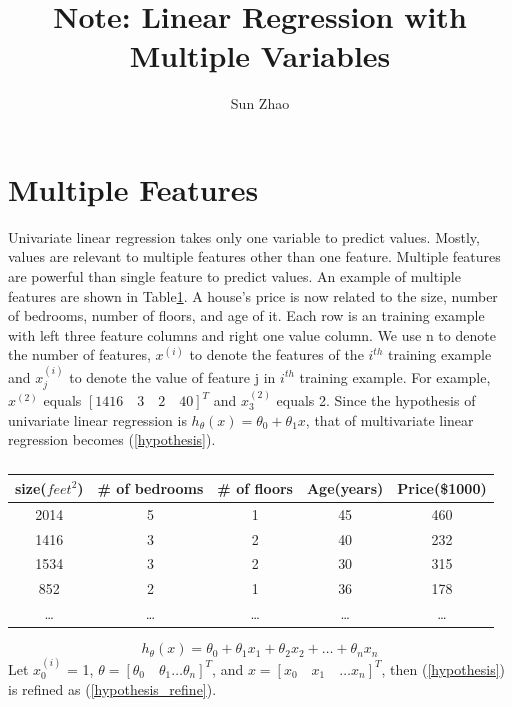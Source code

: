 \documentclass{article}
\title{Note: Linear Regression with Multiple Variables}
\author{Sun Zhao}
\begin{document}
\maketitle
\newpage

\section{Multiple Features}
Univariate linear regression takes only one variable to predict values. Mostly, values are relevant to multiple features other than one feature. Multiple features are powerful than single
 feature to predict values. An example of multiple features are shown in Table\ref{multivate_feature_example}. A house's price is now related to the size, number of bedrooms, number of floors, and age of it. Each row is an training example with left three feature columns and right one value column. We use n to denote the number of features, $x^{(i)}$ to denote the features of the $i^{th}$ training example and $x^{(i)}_{j}$ to denote the value of feature j in $i^{th}$ training example. For example, $x^{(2)}$ equals $[1416 \quad 3 \quad 2 \quad 40]^{T}$ and $x^{(2)}_{3}$ equals 2. Since the hypothesis of univariate linear regression is $h_{\theta}(x) = \theta_{0} + \theta_{1}x$, that of multivariate linear regression becomes (\ref{hypothesis}).

\begin{table}[ht]
\begin{center}
\caption{}\label{multivate_feature_example}
\begin{tabular}{c|c|c|c|c}
\hline
size($feet^{2}$) & \# of bedrooms & \# of floors & Age(years) & Price(\$1000)\\
\hline
2014    &   5   &   1   &   45  &   460\\
1416    &   3   &   2   &   40  &   232\\
1534    &   3   &   2   &   30  &   315\\
852     &   2   &   1   &   36  &   178\\
\ldots & \ldots &  \ldots & \ldots & \ldots\\
\end{tabular}
\end{center}
\end{table}

\begin{equation}\label{hypothesis}
   h_{\theta}(x) = \theta_{0} + \theta_{1}x_{1} + \theta_{2}x_{2} + \ldots + \theta_{n}x_{n}
\end{equation}
Let $x^{(i)}_{0}$ = 1, $\theta = [\theta_{0} \quad \theta_{1} \ldots \theta_{n}]^{T}$, and $x = [x_{0} \quad x_{1} \quad \ldots x_{n}]^{T}$, then (\ref{hypothesis}) is refined as (\ref{hypothesis_refine}).
\end{document}
